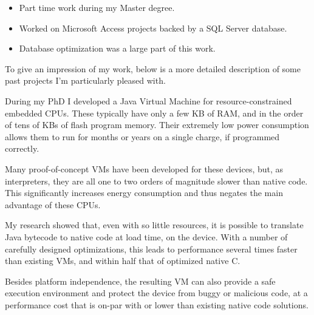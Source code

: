 \documentclass[10pt,a4paper]{../altacv}
\begin{document}
\begin{itemize}
	\item Part time work during my Master degree.
	\item Worked on Microsoft Access projects backed by a SQL Server database.
	\item Database optimization was a large part of this work.
\end{itemize}

\medskip










\newpage

\begin{fullwidth}

To give an impression of my work, below is a more detailed description of some past projects I’m particularly pleased with.

\bigskip


During my PhD I developed a Java Virtual Machine for resource-constrained embedded CPUs. These typically have only a few KB of RAM, and in the order of tens of KBs of flash program memory. Their extremely low power consumption allows them to run for months or years on a single charge, if programmed correctly.

\medskip\medskip

Many proof-of-concept VMs have been developed for these devices, but, as interpreters, they are all one to two orders of magnitude slower than native code. This significantly increases energy consumption and thus negates the main advantage of these CPUs.

\medskip\medskip

My research showed that, even with so little resources, it is possible to translate Java bytecode to native code at load time, on the device. With a number of carefully designed optimizations, this leads to performance several times faster than existing VMs, and within half that of optimized native C.

\medskip\medskip

Besides platform independence, the resulting VM can also provide a safe execution environment and protect the device from buggy or malicious code, at a performance cost that is on-par with or lower than existing native code solutions.


\end{fullwidth}
\end{document}
